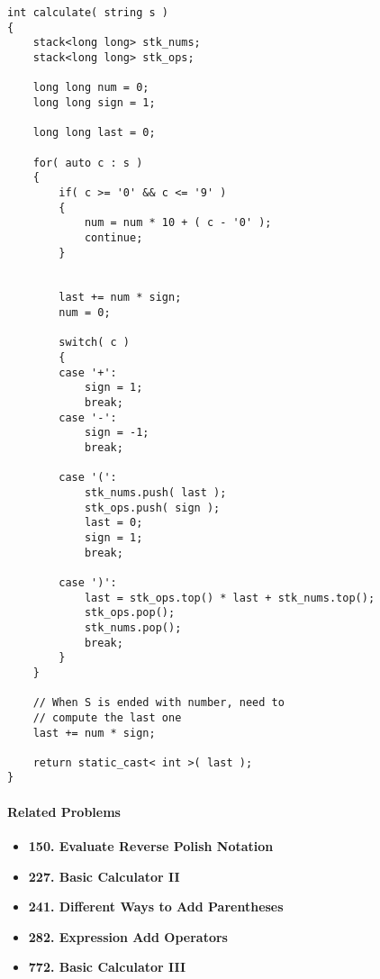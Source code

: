 \setcounter{lstlisting}{0}
\begin{lstlisting}[style=customc, caption={Stack}]
int calculate( string s )
{
    stack<long long> stk_nums;
    stack<long long> stk_ops;

    long long num = 0;
    long long sign = 1;

    long long last = 0;

    for( auto c : s )
    {
        if( c >= '0' && c <= '9' )
        {
            num = num * 10 + ( c - '0' );
            continue;
        }


        last += num * sign;
        num = 0;

        switch( c )
        {
        case '+':
            sign = 1;
            break;
        case '-':
            sign = -1;
            break;

        case '(':
            stk_nums.push( last );
            stk_ops.push( sign );
            last = 0;
            sign = 1;
            break;

        case ')':
            last = stk_ops.top() * last + stk_nums.top();
            stk_ops.pop();
            stk_nums.pop();
            break;
        }
    }

	// When S is ended with number, need to 
	// compute the last one
    last += num * sign;

    return static_cast< int >( last );
}
\end{lstlisting}

\paragraph{Related Problems}
\begin{itemize}
\item \textbf{150. Evaluate Reverse Polish Notation}
\item \textbf{227. Basic Calculator II}
\item \textbf{241. Different Ways to Add Parentheses}
\item \textbf{282. Expression Add Operators}
\item \textbf{772. Basic Calculator III}
\end{itemize}